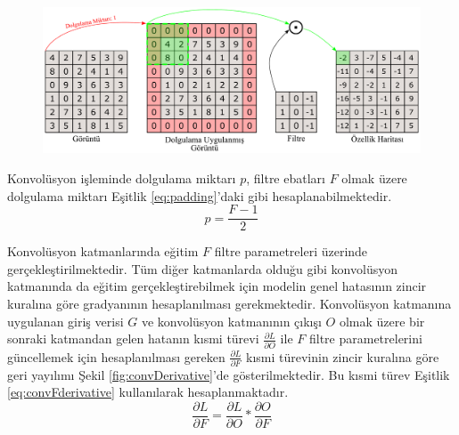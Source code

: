 \begin{figure}[h!]
	\begin{center}
		\vspace{0.4cm}
		{
			\vspace{0.4cm}
			\includegraphics[scale=0.32]{Yapilan-Calismalar/Figures/conv2Dpadding.pdf}
		}
	\end{center}
\end{figure}

Konvolüsyon işleminde dolgulama miktarı $p$, filtre ebatları $F$ olmak üzere dolgulama miktarı Eşitlik \ref{eq:padding}'daki gibi hesaplanabilmektedir.
\begin{equation}
	\label{eq:padding}
	p=\frac{F-1}{2}
\end{equation}

Konvolüsyon katmanlarında eğitim $F$ filtre parametreleri üzerinde gerçekleştirilmektedir. Tüm diğer katmanlarda olduğu gibi konvolüsyon katmanında da eğitim gerçekleştirebilmek için modelin genel hatasının zincir kuralına göre gradyanının hesaplanılması gerekmektedir. Konvolüsyon katmanına uygulanan giriş verisi $G$ ve konvolüsyon katmanının çıkışı $O$ olmak üzere bir sonraki katmandan gelen hatanın kısmi türevi $\frac{\partial L}{\partial  O}$ ile $F$ filtre parametrelerini güncellemek için hesaplanılması gereken $\frac{\partial L}{\partial  F}$ kısmi türevinin zincir kuralına göre geri yayılımı Şekil \ref{fig:convDerivative}'de gösterilmektedir. Bu kısmi türev Eşitlik \ref{eq:convFderivative} kullanılarak hesaplanmaktadır.
\begin{equation}
	\label{eq:convFderivative}
	\frac{\partial L}{\partial  F} = \frac{\partial L}{\partial  O}* \frac{\partial O}{\partial  F}
\end{equation}

